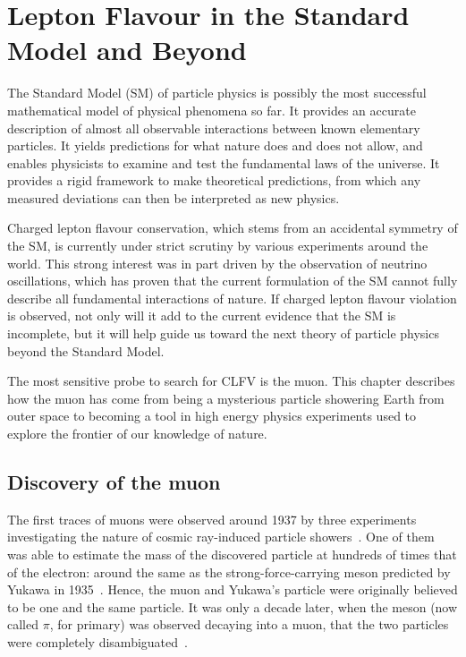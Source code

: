 \chapter{Lepton Flavour in the Standard Model and Beyond}\label{chapter1}

The Standard Model (SM) of particle physics is possibly the most successful
mathematical model of physical phenomena so far. It provides an accurate
description of almost all observable interactions between known elementary
particles. It yields predictions for what nature does and does not allow, and
enables physicists to examine and test the fundamental laws of the universe. It
provides a rigid framework to make theoretical predictions, from which any
measured deviations can then be interpreted as new physics.

Charged lepton flavour conservation, which stems from an accidental symmetry of
the SM, is currently under strict scrutiny by various experiments around the
world. This strong interest was in part driven by the observation of neutrino
oscillations, which has proven that the current formulation of the SM cannot
fully describe all fundamental interactions of nature. If charged lepton flavour
violation is observed, not only will it add to the current evidence that the SM
is incomplete, but it will help guide us toward the next theory of particle
physics beyond the Standard Model.

The most sensitive probe to search for CLFV is the muon. This chapter describes
how the muon has come from being a mysterious particle showering Earth from
outer space to becoming a tool in high energy physics experiments used to
explore the frontier of our knowledge of nature.


\section{Discovery of the muon}
The first traces of muons were observed around 1937 by three experiments
investigating the nature of cosmic ray-induced particle
showers~\cite{PhysRev.51.884, PhysRev.52.1198, PhysRev.52.1003}. One of them was
able to estimate the mass of the discovered particle at hundreds of times that of the
electron: around the same as the strong-force-carrying meson predicted by Yukawa
in 1935~\cite{10.1143/PTPS.1.1}. Hence, the muon and Yukawa's particle were
originally believed to be one and the same particle. It was only a decade later,
when the meson (now called $\pi$, for primary) was observed decaying into a
muon, that the two particles were completely disambiguated~\cite{LATTES1947}.

